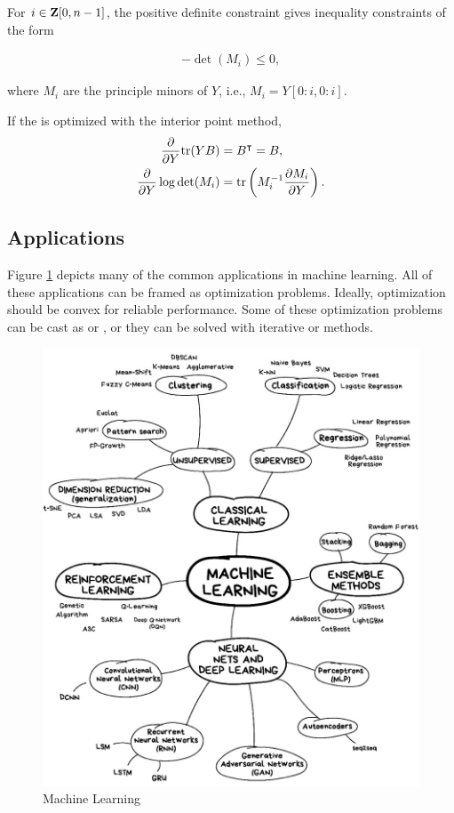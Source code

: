 \documentclass{article}
\begin{document}
For $i\in\textbf{Z}[0,n-1]$, the positive definite constraint 
gives inequality constraints of the form

\begin{align*}
    -\det(M_i)\leq 0,
\end{align*}

where $M_i$ are the principle minors of $Y$, i.e., $M_i=Y[0:i,0:i]$.

If the \SDP is optimized with the interior point method,
\begin{align*}
    \frac{\partial }{\partial Y}\text{tr}(YB)&=B^\intercal=B,\\
    \frac{\partial }{\partial Y}\log\det(M_i)&=\text{tr}\left(M_i^{-1}\frac{\partial M_i}{\partial Y}\right).
\end{align*}



\clearpage

\subsection{Applications}

Figure \ref{fig:ml} depicts many of the common applications in machine learning.
All of these applications can be framed as optimization problems.
Ideally, optimization should be convex for reliable performance.
Some of these optimization problems can be cast as \LP or \QP,
or they can be solved with iterative \LP or \QP methods.

\begin{figure}[h!]
    \centering
    \includegraphics[width=1\textwidth]{./figs/np/ml.jpg}
    \caption{Machine Learning}
    \label{fig:ml}
\end{figure}
\end{document}
